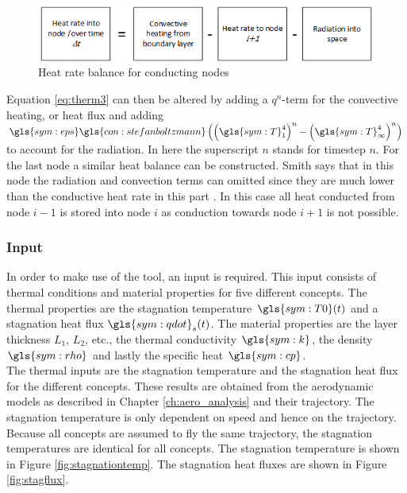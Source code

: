 \begin{figure}[H]
	\centering
	\includegraphics{Figure/thermblocknode2.png}
	\caption{Heat rate balance for conducting nodes}
	\label{fig:thermbalance2}
\end{figure}

Equation \eqref{eq:therm3} can then be altered by adding a $q^n$-term for the convective heating, or heat flux and adding  $\gls{sym:eps}\gls{con:stefanboltzmann}\left(\left(\gls{sym:T}_1^4\right)^n-\left(\gls{sym:T}_\infty^4\right)^n\right)$ to account for the radiation. In here the superscript $n$ stands for timestep $n$. For the last node a similar heat balance can be constructed. Smith says that in this node the radiation and convection terms can omitted since they are much lower than the conductive heat rate in this part \cite{Smith2011}. In this case all heat conducted from node $i-1$ is stored into node $i$ as conduction towards node $i+1$ is not possible.


\subsubsection{Input}
In order to make use of the tool, an input is required. This input consists of thermal conditions and material properties for five different concepts. The thermal properties are the stagnation temperature $ \gls{sym:T0}(t) $ and a stagnation heat flux $ \gls{sym:qdot}_s(t) $. The material properties are the layer thickness $ L_1 $, $ L_2 $, etc., the thermal conductivity $ \gls{sym:k} $, the density $ \gls{sym:rho} $ and lastly the specific heat $ \gls{sym:cp} $.\\

The thermal inputs are the stagnation temperature and the stagnation heat flux for the different concepts. These results are obtained from the aerodynamic models as described in Chapter \ref{ch:aero_analysis} and their trajectory. The stagnation temperature is only dependent on speed and hence on the trajectory. Because all concepts are assumed to fly the same trajectory, the stagnation temperatures are identical for all concepts. The stagnation temperature is shown in Figure \ref{fig:stagnationtemp}. The stagnation heat fluxes are shown in Figure \ref{fig:stagflux}.  \\

